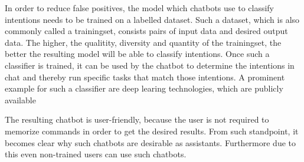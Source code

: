 In order to reduce false positives, the model which chatbots use to classify intentions needs to be trained on a labelled dataset. Such a dataset, which is also commonly called a trainingset, consists pairs of input data and desired output data. The higher, the qualitity, diversity and quantity of the trainingset, the better the resulting model will be able to classify intentions.
Once such a classifier is trained, it can be used by the chatbot to determine the intentions in chat and thereby run specific tasks that match those intentions.
A prominent example for such a classifier are deep learing technologies, which are publicly available \cite{NLKl19}

The resulting chatbot is user-friendly, because the user is not required to memorize commands in order to get the desired results. From such standpoint, it becomes clear why such chatbots are desirable as assistants. Furthermore due to this even non-trained users can use such chatbots.